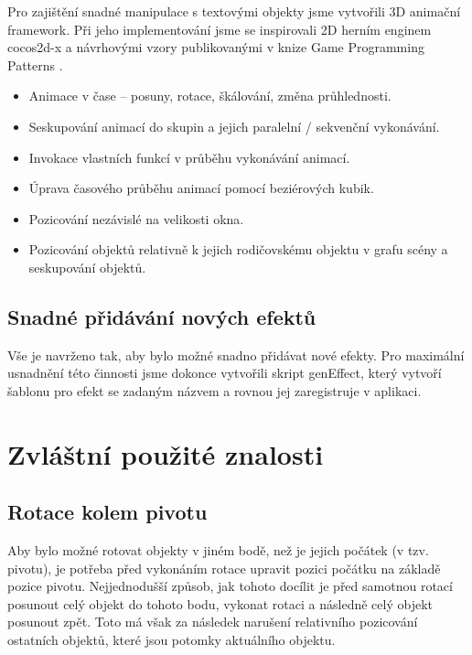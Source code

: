 \documentclass[12pt,a4paper,titlepage,final]{report}
\begin{document}
Pro zajištění snadné manipulace s textovými objekty jsme vytvořili 3D animační framework. Při jeho implementování jsme se inspirovali 2D herním enginem cocos2d-x\cite{cocos} a návrhovými vzory publikovanými v knize Game Programming Patterns \cite{patterns}.

\begin{itemize}
	\item Animace v čase -- posuny, rotace, škálování, změna průhlednosti.
    \item Seskupování animací do skupin a jejich paralelní / sekvenční vykonávání.
    \item Invokace vlastních funkcí v průběhu vykonávání animací.
    \item Úprava časového průběhu animací pomocí beziérových kubik\cite{bezier}.
    \item Pozicování nezávislé na velikosti okna.
    \item Pozicování objektů relativně k jejich rodičovskému objektu v grafu scény a seskupování objektů.
\end{itemize}


\section{Snadné přidávání nových efektů}

Vše je navrženo tak, aby bylo možné snadno přidávat nové efekty. Pro maximální usnadnění této činnosti jsme dokonce vytvořili skript genEffect, který vytvoří šablonu pro efekt se zadaným názvem a rovnou jej zaregistruje v aplikaci.


\chapter{Zvláštní použité znalosti} \label{znalosti}

\section{Rotace kolem pivotu}

Aby bylo možné rotovat objekty v jiném bodě, než je jejich počátek (v tzv. pivotu), je potřeba před vykonáním rotace upravit pozici počátku na základě pozice pivotu. Nejjednodušší způsob, jak tohoto docílit je před samotnou rotací posunout celý objekt do tohoto bodu, vykonat rotaci a následně celý objekt posunout zpět. Toto má však za následek narušení relativního pozicování ostatních objektů, které jsou potomky aktuálního objektu.
\end{document}
